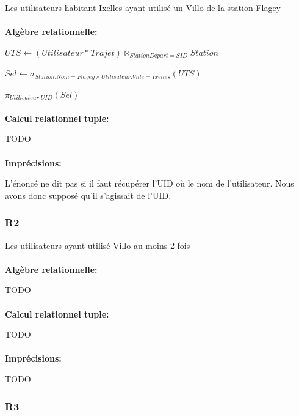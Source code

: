 \documentclass[a4paper, 12pt]{report}
\begin{document}
Les utilisateurs habitant Ixelles ayant utilisé un Villo de la station Flagey
\paragraph{}
\textbf{Algèbre relationnelle:}

$UTS\leftarrow (Utilisateur * Trajet)\bowtie_{StationDépart=SID} Station$

$Sel\leftarrow \sigma_{Station.Nom=Flagey\wedge Utilisateur.Ville=Ixelles}(UTS)$

$\pi_{Utilisateur.UID}(Sel)$
\paragraph{}
\textbf{Calcul relationnel tuple:}

TODO %

\paragraph{}
\textbf{Imprécisions:}

L'énoncé ne dit pas si il faut récupérer l'UID où le nom de l'utilisateur. Nous avons donc supposé qu'il s'agissait de l'UID.

\subsubsection*{R2}

Les utilisateurs ayant utilisé Villo au moins 2 fois
\paragraph{}
\textbf{Algèbre relationnelle:}

TODO %

\paragraph{}
\textbf{Calcul relationnel tuple:}

TODO %

\paragraph{}
\textbf{Imprécisions:}

TODO%

\subsubsection*{R3}
\end{document}
